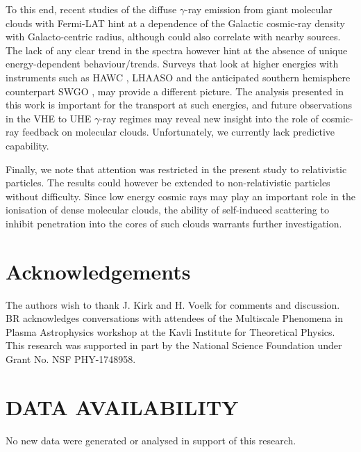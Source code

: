 \documentclass[a4paper,fleqn,usenatbib]{mnras}
\begin{document}
To this end, recent studies of the diffuse $\gamma$-ray emission from giant molecular clouds with Fermi-LAT \cite[e.g.][]{Aharonian} hint at a dependence of the Galactic cosmic-ray density with Galacto-centric radius, although could also correlate with nearby sources. The lack of any clear trend in the spectra however hint at the absence of unique energy-dependent behaviour/trends. Surveys that look at higher energies with instruments such as HAWC \citep{Lauer}, LHAASO \citep{LHAASO} and the anticipated southern hemisphere counterpart SWGO \citep{SWGO}, may provide a different picture.  The analysis presented in this work is important for the transport at such energies, and future observations in the VHE to UHE  $\gamma$-ray regimes may reveal new insight into the role of cosmic-ray feedback on molecular clouds. Unfortunately, we currently lack predictive capability.

Finally, we note that attention was restricted in the present study to relativistic particles. The results could however be extended to non-relativistic particles without difficulty. Since low energy cosmic rays may play an important role in the ionisation of dense molecular clouds, the ability of self-induced scattering to inhibit penetration into the cores of such clouds warrants further investigation.
  

\section*{Acknowledgements}

The authors wish to thank J. Kirk and H. Voelk for comments and discussion. BR acknowledges conversations with attendees of the Multiscale Phenomena in Plasma Astrophysics workshop at the Kavli Institute for Theoretical Physics. This research was supported in part by the National Science Foundation under Grant No. NSF PHY-1748958.


\section*{DATA AVAILABILITY}

No new data were generated or analysed in support of this research.




\end{document}
